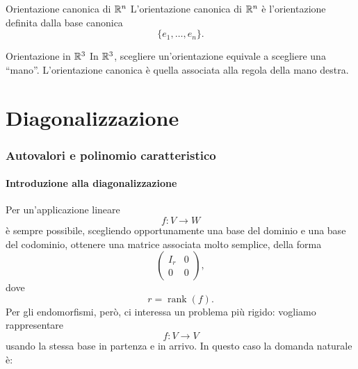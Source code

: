 \documentclass[a4paper]{article}
\begin{document}
\begin{snippetdefinition}{Orientazione canonica di \(\mathbb{R}^n\)}
    L'orientazione canonica di \(\mathbb{R}^n\) è l'orientazione definita dalla base canonica
    \[
        \{e_1,\ldots,e_n\}.
    \]
\end{snippetdefinition}

\begin{snippetexample}{Orientazione in \(\mathbb{R}^3\)}
    In \(\mathbb{R}^3\), scegliere un'orientazione equivale a scegliere una “mano”. L'orientazione canonica è quella associata alla regola della mano destra.

    \begin{center}
    \end{center}
\end{snippetexample}

\part{Diagonalizzazione}

\section{Autovalori e polinomio caratteristico}

\subsection{Introduzione alla diagonalizzazione}

Per un'applicazione lineare
\[
    f:V\to W
\]
è sempre possibile, scegliendo opportunamente una base del dominio e una base del codominio, ottenere una matrice associata molto semplice, della forma
\[
    \begin{pmatrix}
        I_r & 0\\
        0 & 0
    \end{pmatrix},
\]
dove
\[
    r=\operatorname{rank}(f).
\]
Per gli endomorfismi, però, ci interessa un problema più rigido: vogliamo rappresentare
\[
    f:V\to V
\]
usando la stessa base in partenza e in arrivo. In questo caso la domanda naturale è:
\end{document}
